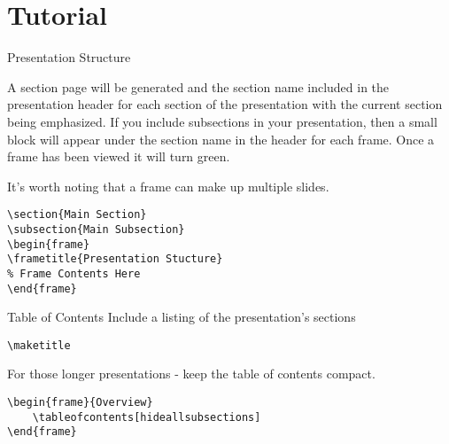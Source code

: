 \documentclass[compress,PxFont]{beamer}
\begin{document}
%
%

\section{Tutorial}


\begin{frame}[containsverbatim]{Presentation Structure}

A section page will be generated and the section name included in the presentation header for each section of the presentation with the current section being emphasized.  If you include subsections in your presentation, then a small block will appear under the section name in the header for each frame.  Once a frame has been viewed it will turn green.

It's worth noting that a frame can make up multiple slides.

\begin{verbatim}
\section{Main Section}
\subsection{Main Subsection}
\begin{frame}
\frametitle{Presentation Stucture}
% Frame Contents Here
\end{frame}
\end{verbatim}
\end{frame}


\begin{frame}[containsverbatim]{Table of Contents}
Include a listing of the presentation's sections 
\begin{verbatim}
\maketitle
\end{verbatim}
For those longer presentations - keep the table of contents compact.
\begin{verbatim}
\begin{frame}{Overview}
    \tableofcontents[hideallsubsections]
\end{frame}
\end{verbatim}
\end{frame}
\end{document}
